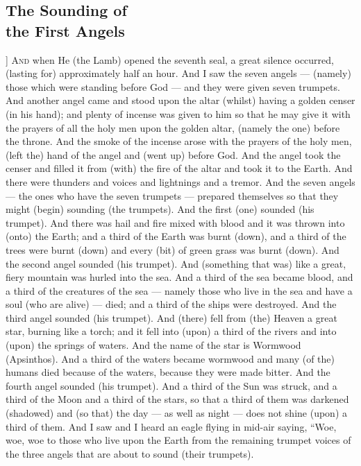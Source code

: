 \begin{pages}
\begin{Leftside}
        			\chapter{The Sounding of \\ the First Angels}
				]
		\renewcommand{\LettrineFontHook}{\Zallmanfamily}
		\lettrine[lines=3]{A}{nd} when He (the Lamb) opened the seventh seal, a great silence occurred, (lasting for) approximately half an hour. And I saw the seven angels — (namely) those which were standing before God — and they were given seven trumpets. And another angel came and stood upon the altar (whilst) having a golden censer (in his hand); and plenty of incense was given to him so that he may give it with the prayers of all the holy men upon the golden altar, (namely the one) before the throne.
		\pend
		\pstart
		And the smoke of the incense arose with the prayers of the holy men, (left the) hand of the angel and (went up) before God. And the angel took the censer and filled it from (with) the fire of the altar and took it to the Earth. And there were thunders and voices and lightnings and a tremor. And the seven angels — the ones who have the seven trumpets — prepared themselves so that they might (begin) sounding (the trumpets). 
		\pend
		\pstart
		And the first (one) sounded (his trumpet). And there was hail and fire mixed with blood and it was thrown into (onto) the Earth; and a third of the Earth was burnt (down), and a third of the trees were burnt (down) and every (bit) of green grass was burnt (down).
		\pend
		\pstart
		And the second angel sounded (his trumpet). And (something that was) like a great, fiery mountain was hurled into the sea. And a third of the sea became blood, and a third of the creatures of the sea — namely those who live in the sea and have a soul (who are alive) — died; and a third of the ships were destroyed. 
		\pend
		\pstart
		And the third angel sounded (his trumpet). And (there) fell from (the) Heaven a great star, burning like a torch; and it fell into (upon) a third of the rivers and into (upon) the springs of waters. And the name of the star is Wormwood (Apsinthos). And a third of the waters became wormwood and many (of the) humans died because of the waters, because they were made bitter. 
		\pend
		\pstart
		And the fourth angel sounded (his trumpet). And a third of the Sun was struck, and a third of the Moon and a third of the stars, so that a third of them was darkened (shadowed) and (so that) the day — as well as night — does not shine (upon) a third of them. And I saw and I heard an eagle flying in mid-air saying, “Woe, woe, woe to those who live upon the Earth from the remaining trumpet voices of the three angels that are about to sound (their trumpets). 
		\pend
        \endnumbering
    \end{Leftside}

\end{pages} 
\Pages


